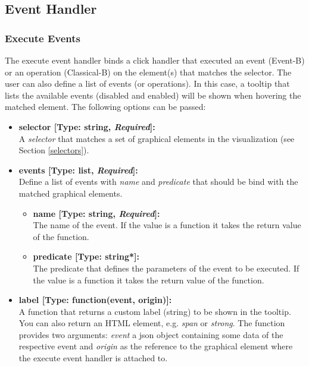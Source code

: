 \pagebreak

\subsection{Event Handler}
\label{b_event_handler}

\subsubsection{Execute Events}

The execute event handler binds a click handler that executed an event (Event-B) or an operation (Classical-B) on the element(s) that matches the selector.
The user can also define a list of events (or operations).
In this case, a tooltip that lists the available events (disabled and enabled) will be shown when hovering the matched element.
The following options can be passed:

\begin{itemize}

\item[] \textbf{selector [Type: string, \textit{Required}]:}\\ A \textit{selector} that matches a set of graphical elements in the visualization (see Section \ref{selectors}).

\item[] \textbf{events [Type: list, \textit{Required}]:}\\
Define a list of events with \textit{name} and \textit{predicate} that should be bind with the matched graphical elements.

\begin{itemize}

\item[] \textbf{name [Type: string, \textit{Required}]:}\\
The name of the event. 
If the value is a function it takes the return value of the function.

\item[] \textbf{predicate [Type: string*]:}\\
The predicate that defines the parameters of the event to be executed.
If the value is a function it takes the return value of the function.

\end{itemize}

\item[] \textbf{label [Type: function(event, origin)]:}\\
A function that returns a custom label (string) to be shown in the tooltip.
You can also return an HTML element, e.g. \textit{span} or \textit{strong}.
 The function provides two arguments: \textit{event} a json object containing some data of the respective event and \textit{origin} as the reference to the graphical element where the execute event handler is attached to.
	
\end{itemize}

